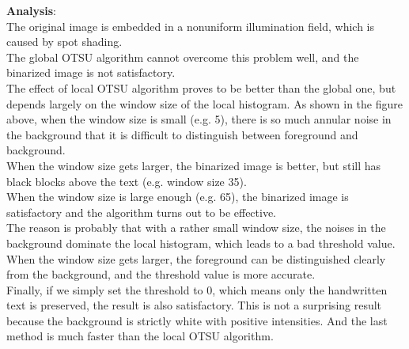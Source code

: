 \documentclass[UTF8]{ctexart}
\begin{document}
\textbf{Analysis}:\\
The original image is embedded in a nonuniform illumination field, which is caused by spot shading.\\
The global OTSU algorithm cannot overcome this problem well, and the binarized image is not satisfactory.\\
The effect of local OTSU algorithm proves to be better than the global one, but depends largely on the window size of the local histogram.
As shown in the figure above, when the window size is small (e.g. 5), there is so much annular noise in the background that it is difficult to 
distinguish between foreground and background.\\
When the window size gets larger, the binarized image is better, but still has black blocks above the text (e.g. window size 35).\\
When the window size is large enough (e.g. 65), the binarized image is satisfactory and the algorithm turns out to be effective.\\
The reason is probably that with a rather small window size, the noises in the background dominate the local histogram, which leads to a bad threshold value. 
When the window size gets larger, the foreground can be distinguished clearly from the background, and the threshold value is more accurate.\\
Finally, if we simply set the threshold to 0, which means only the handwritten text is preserved, the result is also satisfactory. This is not a surprising result
because the background is strictly white with positive intensities.
And the last method is much faster than the local OTSU algorithm.\\
\end{document}
